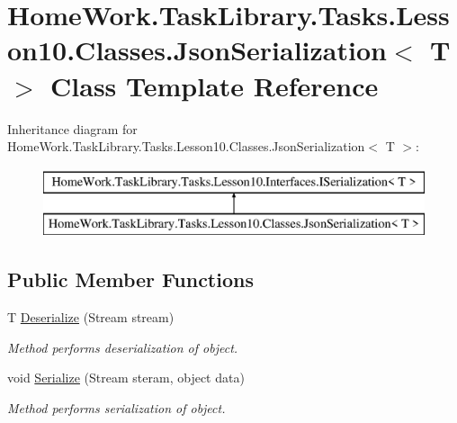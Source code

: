 \hypertarget{class_home_work_1_1_task_library_1_1_tasks_1_1_lesson10_1_1_classes_1_1_json_serialization}{}\section{Home\+Work.\+Task\+Library.\+Tasks.\+Lesson10.\+Classes.\+Json\+Serialization$<$ T $>$ Class Template Reference}
\label{class_home_work_1_1_task_library_1_1_tasks_1_1_lesson10_1_1_classes_1_1_json_serialization}
Inheritance diagram for Home\+Work.\+Task\+Library.\+Tasks.\+Lesson10.\+Classes.\+Json\+Serialization$<$ T $>$\+:\begin{figure}[H]
\begin{center}
\leavevmode
\includegraphics[height=2.000000cm]{class_home_work_1_1_task_library_1_1_tasks_1_1_lesson10_1_1_classes_1_1_json_serialization}
\end{center}
\end{figure}
\subsection*{Public Member Functions}
\begin{DoxyCompactItemize}
\item 
T \mbox{\hyperlink{class_home_work_1_1_task_library_1_1_tasks_1_1_lesson10_1_1_classes_1_1_json_serialization_a7576727ee4f7cb61dad7a0f0c460dd4a}{Deserialize}} (Stream stream)
\begin{DoxyCompactList}\small\item\em Method performs deserialization of object. \end{DoxyCompactList}\item 
void \mbox{\hyperlink{class_home_work_1_1_task_library_1_1_tasks_1_1_lesson10_1_1_classes_1_1_json_serialization_aa6f65546708ffe9f301648bdf35aa025}{Serialize}} (Stream steram, object data)
\begin{DoxyCompactList}\small\item\em Method performs serialization of object. \end{DoxyCompactList}\end{DoxyCompactItemize}


